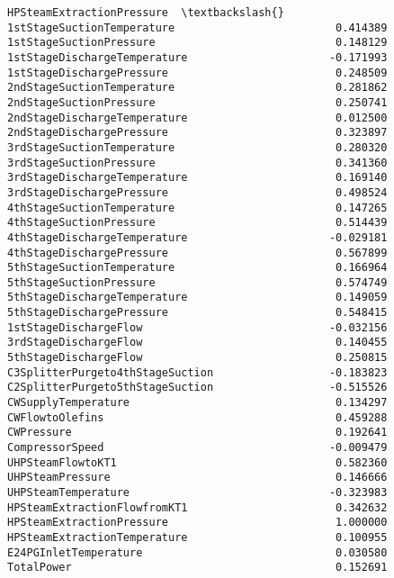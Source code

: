 \documentclass[11pt]{article}
\begin{document}
\begin{tcolorbox}[breakable, size=fbox, boxrule=.5pt, pad at break*=1mm, opacityfill=0]
\begin{Verbatim}[commandchars=\\\{\}]
                                  HPSteamExtractionPressure  \textbackslash{}
1stStageSuctionTemperature                         0.414389
1stStageSuctionPressure                            0.148129
1stStageDischargeTemperature                      -0.171993
1stStageDischargePressure                          0.248509
2ndStageSuctionTemperature                         0.281862
2ndStageSuctionPressure                            0.250741
2ndStageDischargeTemperature                       0.012500
2ndStageDischargePressure                          0.323897
3rdStageSuctionTemperature                         0.280320
3rdStageSuctionPressure                            0.341360
3rdStageDischargeTemperature                       0.169140
3rdStageDischargePressure                          0.498524
4thStageSuctionTemperature                         0.147265
4thStageSuctionPressure                            0.514439
4thStageDischargeTemperature                      -0.029181
4thStageDischargePressure                          0.567899
5thStageSuctionTemperature                         0.166964
5thStageSuctionPressure                            0.574749
5thStageDischargeTemperature                       0.149059
5thStageDischargePressure                          0.548415
1stStageDischargeFlow                             -0.032156
3rdStageDischargeFlow                              0.140455
5thStageDischargeFlow                              0.250815
C3SplitterPurgeto4thStageSuction                  -0.183823
C2SplitterPurgeto5thStageSuction                  -0.515526
CWSupplyTemperature                                0.134297
CWFlowtoOlefins                                    0.459288
CWPressure                                         0.192641
CompressorSpeed                                   -0.009479
UHPSteamFlowtoKT1                                  0.582360
UHPSteamPressure                                   0.146666
UHPSteamTemperature                               -0.323983
HPSteamExtractionFlowfromKT1                       0.342632
HPSteamExtractionPressure                          1.000000
HPSteamExtractionTemperature                       0.100955
E24PGInletTemperature                              0.030580
TotalPower                                         0.152691


\end{Verbatim}
\end{tcolorbox}
\end{document}
